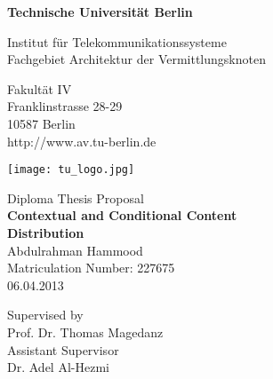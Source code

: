 \thispagestyle{empty}
\begin{center}

\vspace*{1cm}
{\LARGE \textbf{Technische Universität Berlin}}

\vspace{0.5cm}

{\large Institut für Telekommunikationssysteme\\[1mm]}
{\large Fachgebiet Architektur der Vermittlungsknoten\\[5mm]}

Fakultät IV\\
Franklinstrasse 28-29\\
10587 Berlin\\
http://www.av.tu-berlin.de\\
\vspace*{1cm}

\texttt{[image: tu\_logo.jpg]}

\vspace*{1.0cm}

{\LARGE Diploma Thesis Proposal}\\

\vspace{1.0cm}
{\LARGE \textbf{Contextual and Conditional Content}}\\
\vspace*{0.5cm}
{\LARGE \textbf{Distribution}}\\
\vspace*{1.0cm}
{\LARGE Abdulrahman Hammood}
\\
\vspace*{0.5cm}
Matriculation Number: 227675\\
06.04.2013\\ %
\vspace*{0.5cm}

Supervised by\\
Prof. Dr. Thomas Magedanz\\
\vspace*{0.5cm}
Assistant Supervisor\\
Dr. Adel Al-Hezmi
\vspace{2cm}


\end{center}


